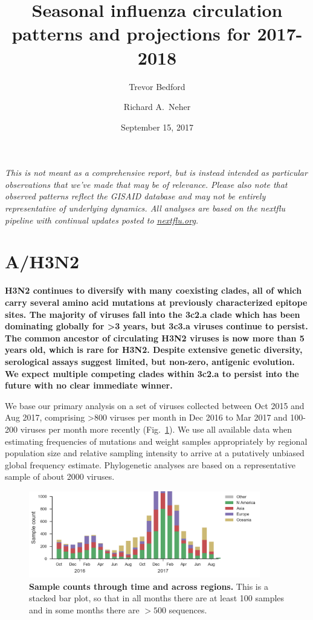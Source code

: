 \documentclass[11pt,oneside,letterpaper]{article}
\title{\vspace{2cm} \LARGE \bf
Seasonal influenza circulation patterns and projections for 2017-2018
}
\author[1]{Trevor Bedford}
\author[2]{Richard A.\ Neher}
\affil[1]{Vaccine and Infectious Disease Division, Fred Hutchinson Cancer Research Center, Seattle, WA, USA}
\affil[2]{Biozentrum, University of Basel, Basel, Switzerland}
\date{September 15, 2017}
\newcommand{\FIG}[1]{Fig.~\ref{#1}}
\begin{document}
\maketitle

\emph{This is not meant as a comprehensive report, but is instead
intended as particular observations that we've made that may be of
relevance. Please also note that observed patterns reflect the GISAID
database and may not be entirely representative of underlying dynamics.
All analyses are based on the nextflu pipeline \cite{neher2015nextflu}
with continual updates posted to \href{http://nextflu.org}{nextflu.org}.}

\tableofcontents

\pagebreak
\section*{A/H3N2}

\textbf{H3N2 continues to diversify with many coexisting clades, all of
which carry several amino acid mutations at previously characterized
epitope sites. The majority of viruses fall into the 3c2.a clade which has
been dominating globally for \textgreater{}3 years, but 3c3.a viruses
continue to persist. The common ancestor of circulating H3N2 viruses is
now more than 5 years old, which is rare for H3N2. Despite extensive
genetic diversity, serological assays suggest limited, but non-zero,
antigenic evolution. We expect multiple competing clades within 3c2.a to
persist into the future with no clear immediate winner.}

We base our primary analysis on a set of viruses collected between Oct
2015 and Aug 2017, comprising \textgreater{}800 viruses per month in Dec
2016 to Mar 2017 and 100-200 viruses per month more recently (\FIG{h3n2_counts}). We use all
available data when estimating frequencies of mutations and weight
samples appropriately by regional population size and relative sampling
intensity to arrive at a putatively unbiased global frequency estimate.
Phylogenetic analyses are based on a representative sample of about 2000
viruses.

\begin{figure}[H]
  \centering
  \includegraphics[width=0.9\textwidth]{../figures/sep-2017/h3n2_counts.png}
  \caption{\textbf{Sample counts through time and across regions.}
  This is a stacked bar plot, so that in all months there are at least 100 samples and in some months there are $>500$ sequences.
  }
  \label{h3n2_counts}
\end{figure}
\end{document}
